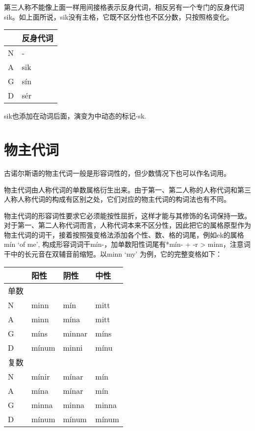 第三人称不能像上面一样用间接格表示反身代词，相反另有一个专门的反身代词sik。如上面所说，sik没有主格，它既不区分性也不区分数，只按照格变化。

\begin{longtable}{ll}
  \toprule
    & 反身代词 \\
  \midrule
  \endhead
  \bottomrule
  \endfoot
  N & -        \\
  A & sik      \\
  G & sín      \\
  D & sér      \\
\end{longtable}

sik也添加在动词后面，演变为中动态的标记-sk.

\section{物主代词}\label{物主代词}

古诺尔斯语的物主代词一般是形容词性的，但少数情况下也可以作名词用。

物主代词由人称代词的单数属格衍生出来。由于第一、第二人称的人称代词和第三人称人称代词的构成有区别之处，它们对应的物主代词的构词法也有不同。

物主代词的形容词性要求它必须能按性屈折，这样才能与其修饰的名词保持一致。对于第一、第二人称代词而言，人称代词本来不区分性，因此把它的属格原型作为物主代词的词干，接着按照强变格法添加各个性、数、格的词尾，例如ek的属格
mín `of me‌', 构成形容词词干mín-，加单数阳性词尾有*mín- + -r
\textgreater{} minn，注意词干中的长元音在双辅音前缩短。以minn `my‌'
为例，它的完整变格如下：

\begin{longtable}{llll}
  \toprule
       & 阳性  & 阴性   & 中性  \\
  \midrule
  \endhead
  \bottomrule
  \endfoot
  单数 &       &        &       \\
  N    & minn  & mín    & mitt  \\
  A    & minn  & mína   & mitt  \\
  G    & míns  & minnar & míns  \\
  D    & mínum & minni  & mínu  \\
  复数 &       &        &       \\
  N    & mínir & mínar  & mín   \\
  A    & mína  & mínar  & mín   \\
  G    & minna & minna  & minna \\
  D    & mínum & mínum  & mínum \\
\end{longtable}

